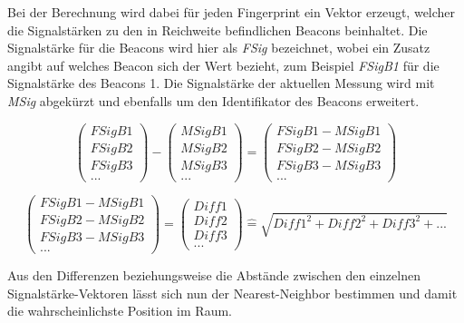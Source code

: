 Bei der Berechnung wird dabei für jeden Fingerprint ein Vektor erzeugt, welcher die Signalstärken zu den in Reichweite befindlichen Beacons beinhaltet.
Die Signalstärke für die Beacons wird hier als \emph{FSig} bezeichnet, wobei ein Zusatz angibt auf welches Beacon sich der Wert bezieht, zum Beispiel \emph{FSigB1} für die Signalstärke des Beacons 1.
Die Signalstärke der aktuellen Messung wird mit \emph{MSig} abgekürzt und ebenfalls um den Identifikator des Beacons erweitert.


\begin{equation}
	\begin{pmatrix}
		FSigB1 \\
		FSigB2 \\
		FSigB3 \\
		...
	\end{pmatrix} -
	\begin{pmatrix}
		MSigB1 \\
		MSigB2 \\
		MSigB3 \\
		...
	\end{pmatrix}
	= 
	\begin{pmatrix}
		FSigB1 - MSigB1 \\
		FSigB2 - MSigB2 \\
		FSigB3 - MSigB3 \\
		...
	\end{pmatrix}
\end{equation}

\begin{equation}
	\begin{pmatrix}
		FSigB1 - MSigB1 \\
		FSigB2 - MSigB2 \\
		FSigB3 - MSigB3 \\
		...
	\end{pmatrix}
	=
	\begin{pmatrix}
		Diff1 \\
		Diff2 \\
		Diff3 \\
		...
	\end{pmatrix}
	\widehat{=}
	\sqrt{Diff1^2 + Diff2^2 + Diff3^2 + ...}
\end{equation}

Aus den Differenzen beziehungsweise die Abstände zwischen den einzelnen Signalstärke-Vektoren lässt sich nun der Nearest-Neighbor bestimmen und damit die wahrscheinlichste Position im Raum.

